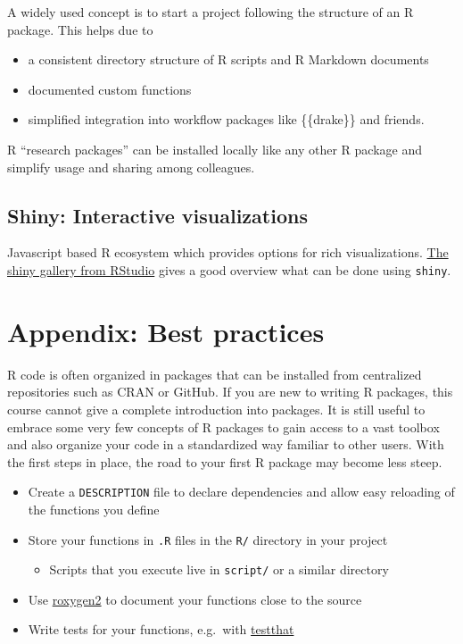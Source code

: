 \documentclass[]{book}
\providecommand{\tightlist}{%
  \setlength{\itemsep}{0pt}\setlength{\parskip}{0pt}}
\begin{document}
A widely used concept is to start a project following the structure of an R package.
This helps due to

\begin{itemize}
\tightlist
\item
  a consistent directory structure of R scripts and R Markdown documents
\item
  documented custom functions
\item
  simplified integration into workflow packages like \{\{drake\}\} and friends.
\end{itemize}

R ``research packages'' can be installed locally like any other R package and simplify usage and sharing among colleagues.

\hypertarget{shiny-interactive-visualizations}{%
\section{Shiny: Interactive visualizations}\label{shiny-interactive-visualizations}}

Javascript based R ecosystem which provides options for rich visualizations.
\href{https://shiny.rstudio.com/gallery/}{The shiny gallery from RStudio} gives a good overview what can be done using \texttt{shiny}.

\hypertarget{appendix-best-practices}{%
\chapter{Appendix: Best practices}\label{appendix-best-practices}}

R code is often organized in packages that can be installed from centralized repositories such as CRAN or GitHub.
If you are new to writing R packages, this course cannot give a complete introduction into packages.
It is still useful to embrace some very few concepts of R packages to gain access to a vast toolbox and also organize your code in a standardized way familiar to other users.
With the first steps in place, the road to your first R package may become less steep.

\begin{itemize}
\tightlist
\item
  Create a \texttt{DESCRIPTION} file to declare dependencies and allow easy reloading of the functions you define
\item
  Store your functions in \texttt{.R} files in the \texttt{R/} directory in your project

  \begin{itemize}
  \tightlist
  \item
    Scripts that you execute live in \texttt{script/} or a similar directory
  \end{itemize}
\item
  Use \href{https://github.com/klutometis/roxygen}{roxygen2} to document your functions close to the source
\item
  Write tests for your functions, e.g.~with \href{https://testthat.r-lib.org/}{testthat}
\end{itemize}
\end{document}

